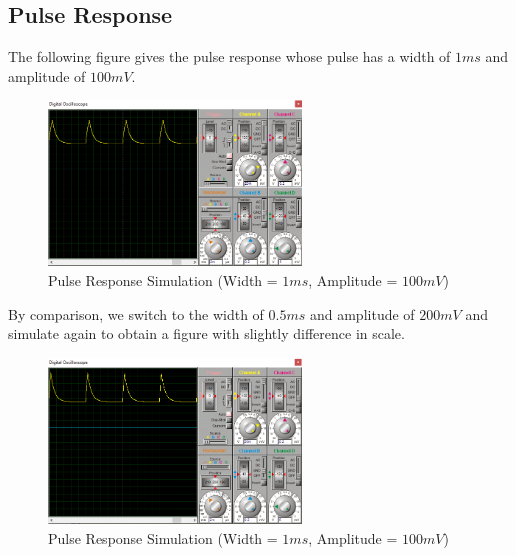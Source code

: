 \documentclass [utf8] {article}
\begin{document}
{    \subsection{Pulse Response}
    {
        The following figure gives the pulse response whose pulse has a width of $1ms$ and amplitude of $100mV$.

        \begin{figure}[H]
            \begin{small}
                \begin{center}
                    \includegraphics[width=0.6\textwidth]{figures/Figure3.png}
                \end{center}
                \caption{Pulse Response Simulation (Width = $1ms$, Amplitude = $100mV$)}
                \label{fig:fig3}
            \end{small}
        \end{figure}

        By comparison, we switch to the width of $0.5ms$ and amplitude of $200mV$ and simulate again to obtain a figure with slightly difference in scale.

        \begin{figure}[H]
            \begin{small}
                \begin{center}
                    \includegraphics[width=0.6\textwidth]{figures/Figure4.png}
                \end{center}
                \caption{Pulse Response Simulation (Width = $1ms$, Amplitude = $100mV$)}
                \label{fig:fig4}
            \end{small}
        \end{figure}
    
}}
\end{document}
